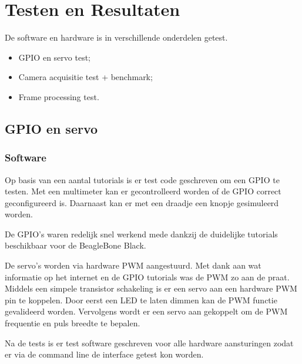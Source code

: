 \chapter{Testen en Resultaten}
\label{chap:testing}


De software en hardware is in verschillende onderdelen getest.
\begin{itemize}
	\item GPIO en servo test;
	\item Camera acquisitie test + benchmark;
	\item Frame processing test.
\end{itemize}

\section{GPIO en servo}
\label{sec:gpioTest}

\subsection{Software}
\label{sub:gpioSoft}
Op basis van een aantal tutorials is er test code geschreven om een GPIO te
testen. Met een multimeter kan er gecontrolleerd worden of de GPIO correct
geconfigureerd is. Daarnaast kan er met een draadje een knopje gesimuleerd
worden.

De GPIO's waren redelijk snel werkend mede dankzij de duidelijke tutorials
beschikbaar voor de BeagleBone Black.

De servo's worden via hardware PWM aangestuurd. Met dank aan wat informatie
op het internet en de GPIO tutorials was de PWM zo aan de praat. Middels een
simpele transistor schakeling is er een servo aan een hardware PWM pin te koppelen.
Door eerst een LED te laten dimmen kan de PWM functie gevalideerd worden.
Vervolgens wordt er een servo aan gekoppelt om de PWM frequentie en puls breedte
te bepalen.

Na de tests is er test software geschreven voor alle hardware aansturingen
zodat er via de command line de interface getest kon worden.

